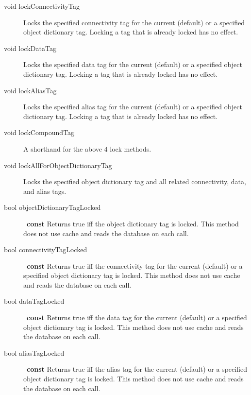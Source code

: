 \begin{description}
\item[void lockConnectivityTag]
  Locks the specified connectivity tag for the current (default) or
  a specified object dictionary tag.
  Locking a tag that is already locked has no effect.

\item[void lockDataTag]
  Locks the specified data tag for the current (default) or
  a specified object dictionary tag.
  Locking a tag that is already locked has no effect.

\item[void lockAliasTag]
  Locks the specified alias tag for the current (default) or
  a specified object dictionary tag.
  Locking a tag that is already locked has no effect.

\item[void lockCompoundTag] A
  shorthand for the above 4 lock methods.

\item[void lockAllForObjectDictionaryTag] 
  Locks the specified object dictionary tag and all related
  connectivity, data, and alias tags.

\item[bool objectDictionaryTagLocked]~\textbf{const}
  Returns true iff the object dictionary tag is locked.  This method
  does not use cache and reads the database on each call.

\item[bool connectivityTagLocked]~\textbf{const}
  Returns true iff the connectivity tag for the current (default) or a
  specified object dictionary tag is locked.  This method
  does not use cache and reads the database on each call.

\item[bool dataTagLocked]~\textbf{const}
  Returns true iff the data tag for the current (default) or a
  specified object dictionary tag is locked.  This method
  does not use cache and reads the database on each call.

\item[bool aliasTagLocked]~\textbf{const}
  Returns true iff the alias tag for the current (default) or a
  specified object dictionary tag is locked.  This method
  does not use cache and reads the database on each call.


\end{description}
